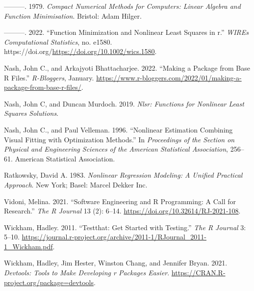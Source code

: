 \documentclass[
]{article}
\newlength{\cslhangindent}
\newlength{\cslentryspacingunit} %
\newenvironment{CSLReferences}[2] %
 {%
  \setlength{\parindent}{0pt}
  \ifodd #1
  \let\oldpar\par
  \def\par{\hangindent=\cslhangindent\oldpar}
  \fi
  \setlength{\parskip}{#2\cslentryspacingunit}
 }%
 {}
\begin{document}
\begin{CSLReferences}{1}{0}
\leavevmode{}%
---------. 1979. \emph{Compact Numerical Methods for Computers: Linear
Algebra and Function Minimisation}. Bristol: Adam Hilger.

\leavevmode{}%
---------. 2022. {``Function Minimization and Nonlinear Least Squares in
r.''} \emph{WIREs Computational Statistics}, no. e1580.
https://doi.org/\url{https://doi.org/10.1002/wics.1580}.

\leavevmode{}%
Nash, John C., and Arkajyoti Bhattacharjee. 2022. {``Making a Package
from Base {R} Files.''} \emph{R-Bloggers}, January.
\url{https://www.r-bloggers.com/2022/01/making-a-package-from-base-r-files/}.

\leavevmode{}%
Nash, John C, and Duncan Murdoch. 2019. \emph{Nlsr: Functions for
Nonlinear Least Squares Solutions}.

\leavevmode{}%
Nash, John C., and Paul Velleman. 1996. {``Nonlinear Estimation
Combining Visual Fitting with Optimization Methods.''} In
\emph{Proceedings of the Section on Physical and Engineering Sciences of
the American Statistical Association}, 256--61. American Statistical
Association.

\leavevmode{}%
Ratkowsky, David A. 1983. \emph{Nonlinear Regression Modeling: A Unified
Practical Approach}. New York; Basel: Marcel Dekker Inc.

\leavevmode{}%
Vidoni, Melina. 2021. {``{Software Engineering and R Programming: A Call
for Research}.''} \emph{{The R Journal}} 13 (2): 6--14.
\url{https://doi.org/10.32614/RJ-2021-108}.

\leavevmode{}%
Wickham, Hadley. 2011. {``Testthat: Get Started with Testing.''}
\emph{The R Journal} 3: 5--10.
\url{https://journal.r-project.org/archive/2011-1/RJournal_2011-1_Wickham.pdf}.

\leavevmode{}%
Wickham, Hadley, Jim Hester, Winston Chang, and Jennifer Bryan. 2021.
\emph{Devtools: Tools to Make Developing r Packages Easier}.
\url{https://CRAN.R-project.org/package=devtools}.

\end{CSLReferences}
\end{document}
